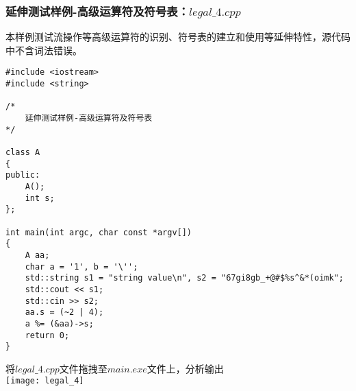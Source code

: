\documentclass[UTF8]{ctexart}
\begin{document}
\subsubsection{延伸测试样例-高级运算符及符号表：$legal\_4.cpp$}
本样例测试流操作等高级运算符的识别、符号表的建立和使用等延伸特性，源代码中不含词法错误。
\begin{lstlisting}
#include <iostream>
#include <string>

/*
    延伸测试样例-高级运算符及符号表
*/

class A
{
public:
    A();
    int s;
};

int main(int argc, char const *argv[])
{
    A aa;
    char a = '1', b = '\'';
    std::string s1 = "string value\n", s2 = "67gi8gb_+@#$%s^&*(oimk";
    std::cout << s1;
    std::cin >> s2;
    aa.s = (~2 | 4);
    a %= (&aa)->s;
    return 0;
}
\end{lstlisting}
将$legal\_4.cpp$文件拖拽至$main.exe$文件上，分析输出 \\
\texttt{[image: legal\_4]}
\end{document}
